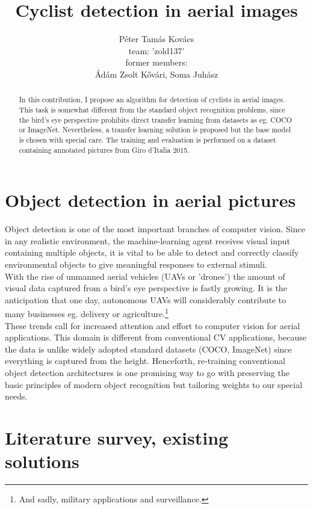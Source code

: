 \documentclass{article}
\title{Cyclist detection in aerial images}
\author{Péter Tamás Kovács\\
team: 'zold137'\\
former members:\\
Ádám Zsolt Kővári, Soma Juhász}
\begin{document}
\maketitle



\begin{abstract}
 In this contribution, I propose an algorithm for detection of cyclists in aerial images. This task is somewhat different from the standard object recognition problems, since the bird's eye perspective prohibits direct transfer learning from datasets as eg. COCO or ImageNet. Nevertheless, a transfer learning solution is proposed but the base model is chosen with special care. The training and evaluation is performed on a dataset containing annotated pictures from Giro d'Italia 2015.  
\end{abstract}

\section{Object detection in aerial pictures}

Object detection is one of the most important branches of computer vision. Since in any realistic environment, the machine-learning agent receives visual input containing multiple objects, it is vital to be able to detect and correctly classify environmental objects to give meaningful responses to external stimuli.\\

With the rise of unmanned aerial vehicles (UAVs or 'drones') the amount of visual data captured from a bird's eye perspective is fastly growing. It is the anticipation that one day, autonomous UAVs will considerably contribute to many businesses eg. delivery or agriculture.\footnote{And sadly, military applications and surveillance.} \\

These trends call for increased attention and effort to computer vision for aerial applications. This domain is different from conventional CV applications, because the data is unlike widely adopted standard datasets (COCO, ImageNet) since everything is captured from the height. Henceforth, re-training conventional object detection architectures is one promising way to go with preserving the basic principles of modern object recognition but tailoring weights to our special needs.\\

\section{Literature survey, existing solutions}
\end{document}
